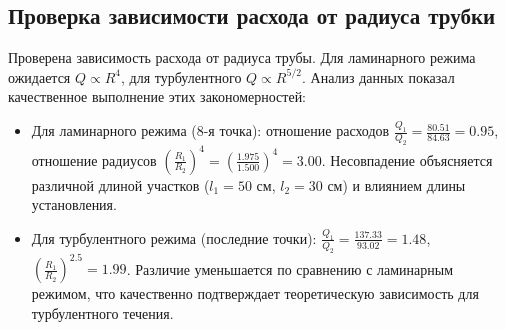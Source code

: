 \documentclass[a4paper]{article}
\begin{document}
\subsection*{Проверка зависимости расхода от радиуса трубки}
Проверена зависимость расхода от радиуса трубы. Для ламинарного режима ожидается $Q \propto R^4$, для турбулентного $Q \propto R^{5/2}$. Анализ данных показал качественное выполнение этих закономерностей:
\begin{itemize}
	\item Для ламинарного режима (8-я точка): отношение расходов $\frac{Q_1}{Q_2} = \frac{80.51}{84.63} = 0.95$, отношение радиусов $\left(\frac{R_1}{R_2}\right)^4 = \left(\frac{1.975}{1.500}\right)^4 = 3.00$. Несовпадение объясняется различной длиной участков ($l_1 = 50$ см, $l_2 = 30$ см) и влиянием длины установления.
	\item Для турбулентного режима (последние точки): $\frac{Q_1}{Q_2} = \frac{137.33}{93.02} = 1.48$, $\left(\frac{R_1}{R_2}\right)^{2.5} = 1.99$. Различие уменьшается по сравнению с ламинарным режимом, что качественно подтверждает теоретическую зависимость для турбулентного течения.
\end{itemize}
\end{document}
